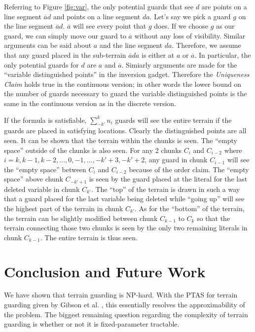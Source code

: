 \documentclass[11pt]{article}
\begin{document}
Referring to Figure \ref{fig:var}, the only potential guards that see $d$ are points on a line segment $\overline{a}d$ and points on a line segment $da$.  Let's say we pick a guard $g$ on the line segment $\overline{a}d$.  $\overline{a}$ will see every point that $g$ does.  If we choose $g$ as our guard, we can simply move our guard to $\overline{a}$ without any loss of visibility.  Similar arguments can be said about $a$ and the line segment $da$.  Therefore, we assume that any guard placed in the sub-terrain $\overline{a}da$ is either at $a$ or $\overline{a}$. In particular, the only potential guards for $d$ are $a$ and $\overline{a}$.  Simiarly arguments are made for the ``variable distinguished points'' in the inversion gadget.  Therefore the {\em Uniqueness Claim} holds true in the continuous version; in other words the lower bound on the number of guards necessary to guard the variable distinguished points is the same in the continuous version as in the discrete version.  

If the formula is satisfiable, $\sum_{-k'}^k n_i$ guards will see the entire terrain if the guards are placed in satisfying locations.  Clearly the distinguished points are all seen.  It can be shown that the terrain within the chunks is seen.  The ``empty space'' outside of the chunks is also seen.  For any 2 chunks $C_i$ and $C_{i-2}$ where $i= k, k-1, k-2, ..., 0, -1, ..., -k'+3, -k'+2$, any guard in chunk $C_{i-1}$ will see the ``empty space'' between $C_i$ and $C_{i-2}$ because of the order claim.  The ``empty space'' above chunk $C_{-k'+1}$ is seen by the guard placed at the literal for the last deleted variable in chunk $C_{k'}$.  The ``top'' of the terrain is drawn in such a way that a guard placed for the last variable being deleted while ``going up'' will see the highest part of the terrain in chunk $C_{k'}$.  As for the ``bottom'' of the terrain, the terrain can be slightly modified between chunk $C_{k-1}$ to $C_k$ so that the terrain connecting those two chunks is seen by the only two remaining literals in chunk $C_{k-1}$.  The entire terrain is thus seen.

\section{Conclusion and Future Work}
We have shown that terrain guarding is NP-hard. With the PTAS for terrain guarding given by Gibson et al. \cite{G09}, this essentially resolves the approximability of the problem. The biggest remaining question regarding the complexity of terrain guarding is whether or not it is fixed-parameter tractable.
\end{document}

